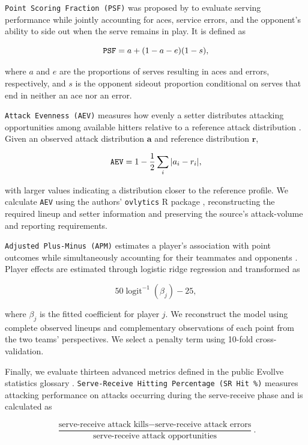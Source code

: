 \documentclass[
  12pt]{article}
\begin{document}
\texttt{Point\ Scoring\ Fraction\ (PSF)} was proposed by
\citet{burton_linear_2015} to evaluate serving performance while jointly
accounting for aces, service errors, and the opponent's ability to side
out when the serve remains in play. It is defined as

\[
\text{\texttt{PSF}}
=
a+(1-a-e)(1-s),
\]

where \(a\) and \(e\) are the proportions of serves resulting in aces
and errors, respectively, and \(s\) is the opponent sideout proportion
conditional on serves that end in neither an ace nor an error.

\texttt{Attack\ Evenness\ (AEV)} measures how evenly a setter
distributes attacking opportunities among available hitters relative to
a reference attack distribution \citep{raymond_attack_2024}. Given an
observed attack distribution \(\mathbf{a}\) and reference distribution
\(\mathbf{r}\),

\[
\text{\texttt{AEV}}
=
1-\frac{1}{2}\sum_i |a_i-r_i|,
\]

with larger values indicating a distribution closer to the reference
profile. We calculate \texttt{AEV} using the authors' \texttt{ovlytics}
R package \citep{raymond_ovlytics_2024}, reconstructing the required
lineup and setter information and preserving the source's attack-volume
and reporting requirements.

\texttt{Adjusted\ Plus-Minus\ (APM)} estimates a player's association
with point outcomes while simultaneously accounting for their teammates
and opponents \citep{hass_exploring_2018}. Player effects are estimated
through logistic ridge regression and transformed as

\[
50\operatorname{logit}^{-1}(\beta_j)-25,
\]

where \(\beta_j\) is the fitted coefficient for player \(j\). We
reconstruct the model using complete observed lineups and complementary
observations of each point from the two teams' perspectives. We select a
penalty term using 10-fold cross-validation.

Finally, we evaluate thirteen advanced metrics defined in the public
Evollve statistics glossary \citep{evollve_glossary_2026}.
\texttt{Serve-Receive\ Hitting\ Percentage\ (SR\ Hit\ \%)} measures
attacking performance on attacks occurring during the serve-receive
phase and is calculated as

\[
\frac{
\text{serve-receive attack kills}-\text{serve-receive attack errors}
}{
\text{serve-receive attack opportunities}
}.
\]
\end{document}
